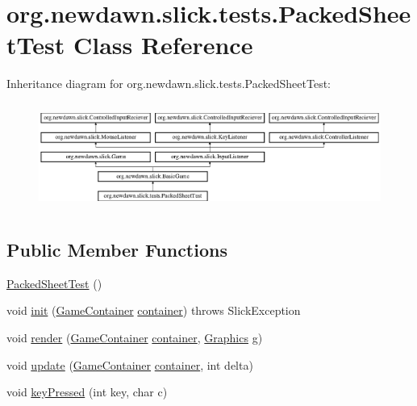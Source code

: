 \hypertarget{classorg_1_1newdawn_1_1slick_1_1tests_1_1_packed_sheet_test}{}\section{org.\+newdawn.\+slick.\+tests.\+Packed\+Sheet\+Test Class Reference}
\label{classorg_1_1newdawn_1_1slick_1_1tests_1_1_packed_sheet_test}
Inheritance diagram for org.\+newdawn.\+slick.\+tests.\+Packed\+Sheet\+Test\+:\begin{figure}[H]
\begin{center}
\leavevmode
\includegraphics[height=3.522012cm]{classorg_1_1newdawn_1_1slick_1_1tests_1_1_packed_sheet_test}
\end{center}
\end{figure}
\subsection*{Public Member Functions}
\begin{DoxyCompactItemize}
\item 
\mbox{\hyperlink{classorg_1_1newdawn_1_1slick_1_1tests_1_1_packed_sheet_test_a86041b335949cf5c245c09409e40936d}{Packed\+Sheet\+Test}} ()
\item 
void \mbox{\hyperlink{classorg_1_1newdawn_1_1slick_1_1tests_1_1_packed_sheet_test_a598c8ee4cfd76482f2f897bc27c818d0}{init}} (\mbox{\hyperlink{classorg_1_1newdawn_1_1slick_1_1_game_container}{Game\+Container}} \mbox{\hyperlink{classorg_1_1newdawn_1_1slick_1_1tests_1_1_packed_sheet_test_a627ba2a3381f2182796b91ede952fa0e}{container}})  throws Slick\+Exception 
\item 
void \mbox{\hyperlink{classorg_1_1newdawn_1_1slick_1_1tests_1_1_packed_sheet_test_a183ae61174b77526979ea217c47b3027}{render}} (\mbox{\hyperlink{classorg_1_1newdawn_1_1slick_1_1_game_container}{Game\+Container}} \mbox{\hyperlink{classorg_1_1newdawn_1_1slick_1_1tests_1_1_packed_sheet_test_a627ba2a3381f2182796b91ede952fa0e}{container}}, \mbox{\hyperlink{classorg_1_1newdawn_1_1slick_1_1_graphics}{Graphics}} g)
\item 
void \mbox{\hyperlink{classorg_1_1newdawn_1_1slick_1_1tests_1_1_packed_sheet_test_ac573a1de52ed6619aaf40a29302279c7}{update}} (\mbox{\hyperlink{classorg_1_1newdawn_1_1slick_1_1_game_container}{Game\+Container}} \mbox{\hyperlink{classorg_1_1newdawn_1_1slick_1_1tests_1_1_packed_sheet_test_a627ba2a3381f2182796b91ede952fa0e}{container}}, int delta)
\item 
void \mbox{\hyperlink{classorg_1_1newdawn_1_1slick_1_1tests_1_1_packed_sheet_test_abd69c8d79e53e21a1e538f0493a40d1e}{key\+Pressed}} (int key, char c)
\end{DoxyCompactItemize}
